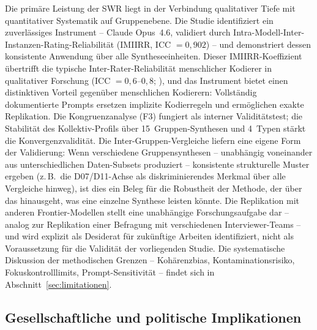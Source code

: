 \documentclass[12pt,a4paper]{article}
\begin{document}
Die primäre Leistung der SWR liegt in der Verbindung qualitativer Tiefe mit quantitativer Systematik auf Gruppenebene. Die Studie identifiziert ein zuverlässiges Instrument -- Claude Opus~4.6, validiert durch Intra-Modell-Inter-Instanzen-Rating-Reliabilität (IMIIRR, ICC $= 0{,}902$) -- und demonstriert dessen konsistente Anwendung über alle Syntheseeinheiten. Dieser IMIIRR-Koeffizient übertrifft die typische Inter-Rater-Reliabilität menschlicher Kodierer in qualitativer Forschung (ICC $= 0{,}6$--$0{,}8$; \citealt{Hallgren2012}), und das Instrument bietet einen distinktiven Vorteil gegenüber menschlichen Kodierern: Vollständig dokumentierte Prompts ersetzen implizite Kodierregeln und ermöglichen exakte Replikation. Die Kongruenzanalyse (F3) fungiert als interner Validitätstest; die Stabilität des Kollektiv-Profils über 15~Gruppen-Synthesen und 4~Typen stärkt die Konvergenzvalidität. Die Inter-Gruppen-Vergleiche liefern eine eigene Form der Validierung: Wenn verschiedene Gruppensynthesen -- unabhängig voneinander aus unterschiedlichen Daten-Subsets produziert -- konsistente strukturelle Muster ergeben (z.\,B.\ die D07/D11-Achse als diskriminierendes Merkmal über alle Vergleiche hinweg), ist dies ein Beleg für die Robustheit der Methode, der über das hinausgeht, was eine einzelne Synthese leisten könnte. Die Replikation mit anderen Frontier-Modellen stellt eine unabhängige Forschungsaufgabe dar -- analog zur Replikation einer Befragung mit verschiedenen Interviewer-Teams -- und wird explizit als Desiderat für zukünftige Arbeiten identifiziert, nicht als Voraussetzung für die Validität der vorliegenden Studie. Die systematische Diskussion der methodischen Grenzen -- Kohärenzbias, Kontaminationsrisiko, Fokuskontrolllimits, Prompt-Sensitivität -- findet sich in Abschnitt~\ref{sec:limitationen}.


\subsection{Gesellschaftliche und politische Implikationen}
\label{sec:diskussion:implikationen}
\end{document}
